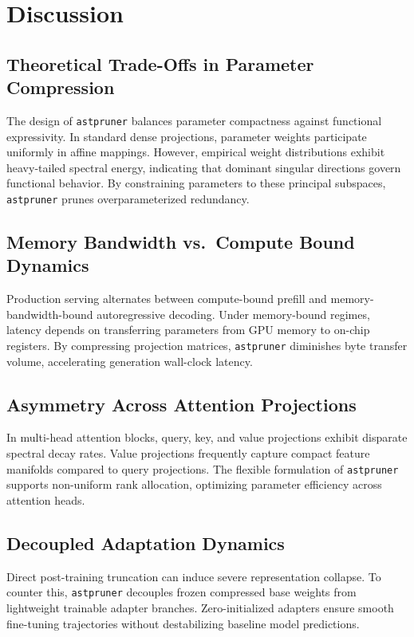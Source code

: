 \section{Discussion}

\subsection{Theoretical Trade-Offs in Parameter Compression}
The design of \texttt{astpruner} balances parameter compactness against functional expressivity. In standard dense projections, parameter weights participate uniformly in affine mappings. However, empirical weight distributions exhibit heavy-tailed spectral energy, indicating that dominant singular directions govern functional behavior. By constraining parameters to these principal subspaces, \texttt{astpruner} prunes overparameterized redundancy.

\subsection{Memory Bandwidth vs.\ Compute Bound Dynamics}
Production serving alternates between compute-bound prefill and memory-bandwidth-bound autoregressive decoding. Under memory-bound regimes, latency depends on transferring parameters from GPU memory to on-chip registers. By compressing projection matrices, \texttt{astpruner} diminishes byte transfer volume, accelerating generation wall-clock latency.

\subsection{Asymmetry Across Attention Projections}
In multi-head attention blocks, query, key, and value projections exhibit disparate spectral decay rates. Value projections frequently capture compact feature manifolds compared to query projections. The flexible formulation of \texttt{astpruner} supports non-uniform rank allocation, optimizing parameter efficiency across attention heads.

\subsection{Decoupled Adaptation Dynamics}
Direct post-training truncation can induce severe representation collapse. To counter this, \texttt{astpruner} decouples frozen compressed base weights from lightweight trainable adapter branches. Zero-initialized adapters ensure smooth fine-tuning trajectories without destabilizing baseline model predictions.

